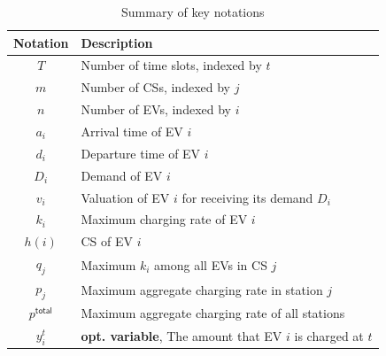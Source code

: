 \documentclass[journal]{IEEEtran}
\begin{document}
		\begin{table} 
			\caption{Summary of key notations}\vspace{-3mm}
			\label{tbl:not}
			\begin{center}
				\begin{tabular}{|c L{6.5cm}|}
					\hline
					\textbf{Notation} & \textbf{Description} \\
					\hline \hline			
					$T$ & Number of time slots, indexed by $t$\\			
					$m$ & Number of CSs, indexed by $j$\\			
					$n$ & Number of EVs, indexed by $i$\\			
					\hline
					\hline
					$a_i$ & Arrival time of EV $i$\\
					$d_i$ & Departure time of EV $i$\\
					$D_i$ & Demand of EV $i$\\
					$v_i$ & Valuation of EV $i$ for receiving its demand $D_i$ \\
					$k_i$ & Maximum charging rate of EV $i$\\
					$h(i)$ & CS of EV $i$\\
					\hline
					\hline
					$q_j$ & Maximum $k_i$ among all EVs in CS $j$\\
					$p_j$ & Maximum aggregate charging rate in station $j$\\
					$p^\mathsf{total}$ & Maximum aggregate charging rate of all stations\\
					\hline
					\hline
					$y_i^t$ & \textbf{opt. variable}, The amount that EV $i$ is charged at $t$ \\
					\hline
				\end{tabular}
			\end{center}
		\end{table}
\end{document}
